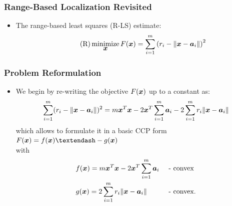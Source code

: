\documentclass [t] {beamer} %
\begin{document}
\begin{frame} %
\frametitle{Range-Based Localization Revisited}
\phantom{m}

\phantom{m}

\phantom{m}

\phantom{m}

\begin{itemize}
\item
The range-based least squares (R-LS) estimate:
\nonumber
\begin{equation} \tag{R}
\mathop{\mbox{minimize}}_{\mbox{\boldmath$x$}} F(\mbox{\boldmath$x$}) = \sum_{i=1}^m \left(r_i  - \|\mbox{\boldmath$x$} - \mbox{\boldmath$a$}_i\| \right)^2
\end{equation}
\end{itemize}
\end{frame}


\begin{frame} %
\frametitle{Problem Reformulation} 
\phantom{m}
\begin{itemize}
\item
We begin by re-writing the objective $F(\mbox{\boldmath$x$})$ up to a constant as:
\begin{equation}
\nonumber
\begin{aligned} 
 \sum_{i=1}^{m} (r_i - \|{\mbox{\boldmath$x$}} - {\mbox{\boldmath$a$}}_i\|)^2 = m\mbox{\boldmath$x$}^T\mbox{\boldmath$x$} - 2 \mbox{\boldmath$x$}^T\sum^m_{i=1} \mbox{\boldmath$a$}_i - 2\sum^m_{i = 1} r_i \|\mbox{\boldmath$x$} - \mbox{\boldmath$a$}_i\|
\end{aligned}
\end{equation}
which allows to formulate it in a basic CCP form $F(\Bx) = f(\Bx) –- g(\Bx)$ \\
with 
\begin{equation}
\nonumber
\begin{aligned}
& f(\mbox{\boldmath$x$})  =  m \mbox{\boldmath$x$}^T\mbox{\boldmath$x$} - 2 \mbox{\boldmath$x$}^T\sum^m_{i=1} \mbox{\boldmath$a$}_i & {} & \mbox{ - convex} \\
& g(\mbox{\boldmath$x$}) =  2 \sum^m_{i = 1} r_i \|\mbox{\boldmath$x$} - \mbox{\boldmath$a$}_i\| & {} & \mbox{ - convex} .
\end{aligned}
\end{equation}

\end{itemize}
\end{frame}
\end{document}
